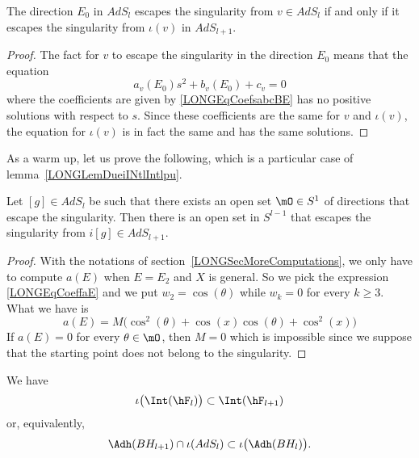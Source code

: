 \begin{lemma}
	The direction $E_0$ in $AdS_l$ escapes the singularity from $v\in AdS_l$ if and only if it escapes the singularity from $\iota(v)$ in $AdS_{l+1}$.
\end{lemma}

\begin{proof}
	The fact for $v$ to escape the singularity in the direction $E_0$ means that the equation
	\begin{equation}
		a_{v}(E_0)s^2+b_{v}(E_0)+c_{v}=0
	\end{equation}
	where the coefficients are given by \eqref{LONGEqCoefsabcBE} has no positive solutions with respect to $s$. Since these coefficients are the same for $v$ and $\iota(v)$, the equation for $\iota(v)$ is in fact the same and has the same solutions.
\end{proof}

%
As a warm up, let us prove the following, which is a particular case of lemma~\ref{LONGLemDueiINtlIntlpu}.
\begin{lemma}
	Let $[g]\in AdS_l$ be such that there exists an open set $\mO\in S^1$ of directions that escape the singularity. Then there is an open set in $S^{l-1}$ that escapes the singularity from $i[g]\in AdS_{l+1}$.
\end{lemma}

\begin{proof}
	With the notations of section~\ref{LONGSecMoreComputations}, we only have to compute $a(E)$ when $E=E_2$ and $X$ is general. So we pick the expression \eqref{LONGEqCoeffaE} and we put $w_2=\cos(\theta)$ while $w_k=0$ for every $k\geq 3$. What we have is
	\begin{equation}
		a(E)=M\Big( \cos^2(\theta)+\cos(x)\cos(\theta)+\cos^2(x) \Big)
	\end{equation}
	If $a(E)=0$ for every $\theta\in\mO$, then $M=0$ which is impossible since we suppose that the starting point does not belong to the singularity.
\end{proof}

\begin{lemma}        \label{LONGLemDueiINtlIntlpu}
	We have
	\begin{equation}
		\iota\big( \Int(\hF_l) \big)\subset\Int(\hF_{l+1})
	\end{equation}
	or, equivalently,
	\begin{equation}
		\Adh(BH_{l+1})\cap\iota(AdS_l)\subset\iota\big( \Adh(BH_l) \big).
	\end{equation}
\end{lemma}


